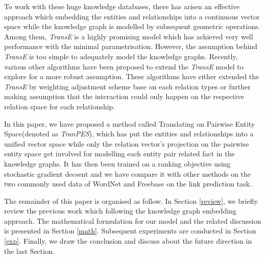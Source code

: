 \documentclass[10pt,journal]{IEEEtran}
\begin{document}
To work with these huge knowledge databases, there has arisen an effective approach which embedding the entities and relationships into a continuous vector space while the knowledge graph is modelled by subsequent geometric operations. Among them, \emph{TransE} \cite{bordes_translating_2013} is a highly promising model which has achieved very well performance with the minimal parametrisation. However, the assumption behind \emph{TransE} is too simple to adequately model the knowledge graphs. Recently, various other algorithms \cite{fan_transition-based_2014} \cite{wang_knowledge_2014} \cite{lin_learning_2015} \cite{garcia-duran_composing_????}  have been proposed to extend the \emph{TransE} model to explore for a more robust assumption. These algorithms have either extended the \emph{TransE} by   weighting adjustment scheme base on each relation types  or further making assumption that the interaction could only happen on the respective relation space for each relationship. 

In this paper, we have proposed a method called Translating on Pairwise Entity Space(denoted as \emph{TranPES}),  which has put the entities and relationships into a unified vector space while only the relation vector's projection on the pairwise entity space get involved for modelling each entity pair related fact in the knowledge graphs. It has then been trained on a ranking objective using stochastic gradient decsent and we have compare it with other methods on the two commonly used data  of WordNet \cite{miller_wordnet:_1995} and Freebase \cite{bollacker_freebase:_2008} on the link prediction task.

The remainder of this paper is organised as follow. In Section \ref{review}, we briefly review the previous work which following the knowledge graph embedding approach. The mathematical formulation for our model and the related discussion is presented in Section \ref{math}. Subsequent experiments are conducted in Section \ref{exp}. Finally, we draw the conclusion and discuss about the future direction in the last Section.
\end{document}
